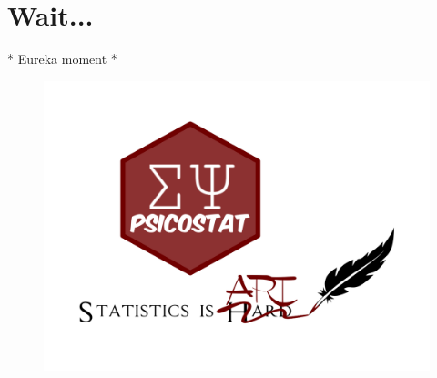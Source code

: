 \documentclass{beamer}
\begin{document}
\section{Wait...}

\begin{frame}
\begin{center}
	* Eureka moment *
\end{center}

\begin{figure}
	\centering
	\includegraphics[width=0.6\linewidth]{psicostat}
\end{figure}


\end{frame}
\end{document}
